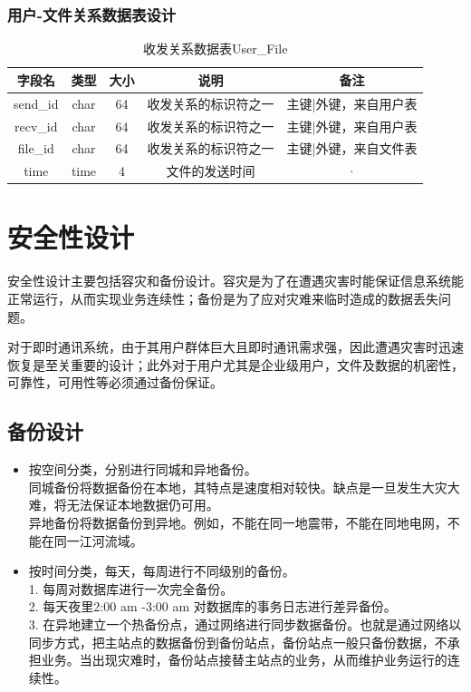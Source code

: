 \subsubsection{用户-文件关系数据表设计}
\begin{table}[htbp]
\centering
\caption{收发关系数据表User\_File} \label{tab:order-database}
\begin{tabular}{|c|c|c|c|c|}
    \hline
    字段名 & 类型 & 大小 & 说明 & 备注 \\
    \hline
    send\_id & char & 64 & 收发关系的标识符之一 & 主键|外键，来自用户表 \\
    \hline
    recv\_id & char & 64 & 收发关系的标识符之一 & 主键|外键，来自用户表 \\
    \hline
    file\_id & char & 64 & 收发关系的标识符之一 & 主键|外键，来自文件表 \\
    \hline
    time & time & 4 & 文件的发送时间 & · \\ 
    \hline
\end{tabular}
\end{table}



\newpage

\section{安全性设计}
安全性设计主要包括容灾和备份设计。容灾是为了在遭遇灾害时能保证信息系统能正常运行，从而实现业务连续性；备份是为了应对灾难来临时造成的数据丢失问题。

对于即时通讯系统，由于其用户群体巨大且即时通讯需求强，因此遭遇灾害时迅速恢复是至关重要的设计；此外对于用户尤其是企业级用户，文件及数据的机密性，可靠性，可用性等必须通过备份保证。

\subsection{备份设计}
\begin{itemize}
\item 按空间分类，分别进行同城和异地备份。\\
同城备份将数据备份在本地，其特点是速度相对较快。缺点是一旦发生大灾大难，将无法保证本地数据仍可用。 \\

异地备份将数据备份到异地。例如，不能在同一地震带，不能在同地电网，不能在同一江河流域。

\item 按时间分类，每天，每周进行不同级别的备份。\\
1. 每周对数据库进行一次完全备份。\\
2. 每天夜里2:00 am -3:00 am 对数据库的事务日志进行差异备份。\\
3. 在异地建立一个热备份点，通过网络进行同步数据备份。也就是通过网络以同步方式，把主站点的数据备份到备份站点，备份站点一般只备份数据，不承担业务。当出现灾难时，备份站点接替主站点的业务，从而维护业务运行的连续性。\\
\end{itemize}

